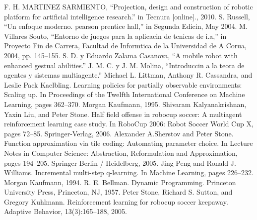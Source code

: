 \documentclass[letterpaper, 10 pt, conference]{ieeeconf}  %
\begin{document}



\begin{thebibliography}{99}

  F. H. MARTINEZ SARMIENTO, “Projection, design and construction of robotic platform for artificial intelligence research.” in Tecnura [online]., 2010.
  S. Russell, “Un enfoque moderno. pearson prentice hall,” in Segunda Edicin, May 2004.
 M. Villares Souto, “Entorno de juegos para la aplicacin de tcnicas de i.a,” in Proyecto Fin de Carrera, Facultad de Informtica de la Universidad de A Corua, 2004, pp. 145–155.
 S. D. y Eduardo Zalama Casanova, “A mobile robot with enhanced gestual abilities.”
 J. M. C. y J. M. Molina, “Introduccin a la teora de agentes y sistemas multiagente.”
 Michael L. Littman, Anthony R. Cassandra, and Leslie Pack Kaelbling. Learning policies for partially observable environments: Scaling up. In Proceedings of the Twelfth International Conference on Machine Learning, pages 362–370. Morgan Kaufmann, 1995.
  Shivaram Kalyanakrishnan, Yaxin Liu, and Peter Stone. Half field offense in robocup soccer: A multiagent reinforcement learning case study. In RoboCup 2006: Robot Soccer World Cup X, pages 72–85. Springer-Verlag, 2006.
 Alexander A.Sherstov and Peter Stone. Function approximation via tile coding: Automating parameter choice. In Lecture Notes in Computer Science: Abstraction, Reformulation and Approximation, pages 194–205. Springer Berlin / Heidelberg, 2005.
Jing Peng and Ronald J. Williams. Incremental multi-step q-learning. In Machine Learning, pages 226–232. Morgan Kaufmann, 1994.
R. E. Bellman. Dynamic Programming. Princeton University Press, Princeton, NJ, 1957.
Peter Stone, Richard S. Sutton, and Gregory Kuhlmann. Reinforcement learning for robocup soccer keepaway. Adaptive Behavior, 13(3):165–188, 2005.

\end{thebibliography}
\end{document}
